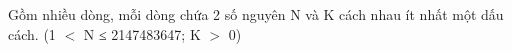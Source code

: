 Gồm nhiều dòng, mỗi dòng chứa 2 số nguyên N và K cách nhau ít nhất một dấu cách. (1 $<$ N ≤ 2147483647; K $>$ 0)

\